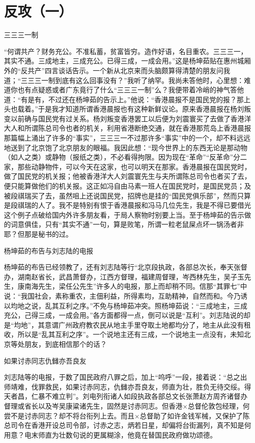 \section[反攻（一） ]{反攻（一） }


三三三一制

“何谓共产？财务充公。不准私蓄，贫富皆穷。造作好语，名目重农。三三三一，其实不通。三成地主，三成充公。已得三成，一成会用。”这是杨坤茹贴在惠州城厢外的“反共产”四言谈话告示。一个新从北京来而头脑颇算得清楚的朋友问我道；“三三三一制到底有这么回事没有？”我听了纳罕。我尚未答他时，心里想：难道你也有点疑惑或者广东竟行了什么“三三三一制”么？我便带着冷峭的神气答他道：“有是有，不过还在杨坤茹的告示上。”他说：“香港晨报不是国民党的报？那上头也载着。”于是我才知道所谓香港晨报也有这种新鲜议论。原来香港晨报在杨刘叛变以前确与国民党有过关系。杨刘叛变香港罢工以后便为刘震寰买了去做了香港洋大人和所谓陈总司令也者的机关，利用省港断绝交通，就在香港那荒岛上香港晨报那篇幅上涌出了许多的“事实”，三三三一不过那许多“事实”中的一个，却不料远远地送到了北京饱了北京朋友的眼福。我因此想：“现今世界上的东西无论是那动物（如人之类）或静物（报纸之类），不必看得拘限。因为现在“革命”“反革命”分二家，那些动静物件，可以今天在这家，也可以明天在那家。香港晨报在国民党时，做了国民党的机关报；他被香港洋大人刘震寰先生与夫所谓陈总司令也者买了去，便只能算做他们的机关报。这正如冯自由马素一班人在国民党时，是国民党员；及被段祺瑞买了去，虽然咀上还说国民党，招牌也是挂的“国民党俱乐部”，然而只算是段祺瑞的人了。我不是特别有恨于香港晨报和冯马几位先生，我是不得已要借光这个例子点破给国内外许多朋友看，于局人察物时别要上当。至于杨坤茹的告示做的词意俱佳，只有“其实不通”一句，算是败笔，所谓一粒老鼠屎点坏一锅汤者非耶？但那是秘书的过。

杨坤茹的布告与刘志陆的电报

杨坤茹的布告已经领教了，还有刘志陆等行“北京段执政，各部总次长，奉天张督办，湖南赵省长，武昌萧督办，江西方督理，福建周督理，岑西林先生，吴子玉先生，康南海先生，梁任公先生”许多人的电报，那上而却稍不同。信那“其罪七”中说：“我国社会，素称重农，主佃利益，所得素均，互助精神，自然而和。今乃诱以均地之说，乱其互利之序。”不免与杨坤茹冲突。照杨坤茹说：“三成地主，三成充公，己得三成，一成会用。”各方面都得一点，倒可以说是“互利”。刘志陆说的却是“均地”，其意谓广州政府教农民从地主手里夺取土地都均分了，地主从此没有租收，所以是“乱其互利之序”。一个说地主还有三成，一个说地主一点没有，未知北京等处朋友，到底相信那个的话？

如果讨赤同志仇雠亦吾良友

刘志陆等的电报，于数了国民政府八罪之后，加上“呜呼”一段，接着说：“总之出师靖难，伐罪救民，如果讨赤同志，仇雠亦吾良友，师直为壮，胜负无待交绥。得天者昌，仁暴不难立判”。刘电列衔诸人如段执政各部总文长张萧赵方周齐诸督办督理或省长以及岑吴康粱诸先生，固然是讨赤同志。但香港×总督伦敦包经理，何尝不是讨赤同志？却不将台衔列上去。而且×总督助了如许金钱军械，又保护了陈总司令在香港开设总司令部，讨赤之志，炳若日星，却偏将台街漏列，真不知是何用意？电末师直为壮数句说的更属糊涂，他竟在替国民政府做功颂德。

